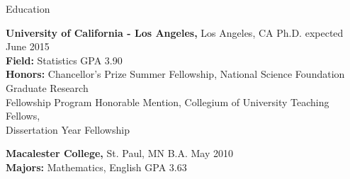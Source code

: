 \documentclass{resume} %
\begin{document}

\begin{rSection}{Education}

{\bf University of California - Los Angeles,} Los Angeles, CA \hfill Ph.D. expected June 2015\\ 
{\bf Field:} Statistics \hfill GPA 3.90 \smallskip \\
{\bf Honors:} Chancellor's Prize Summer Fellowship, National Science Foundation Graduate Research \\Fellowship Program Honorable Mention, Collegium of University Teaching Fellows, \\Dissertation Year Fellowship

{\bf Macalester College,} St. Paul, MN \hfill B.A. May 2010 \\
{\bf Majors:} Mathematics, English \hfill GPA 3.63 
\end{rSection}

\end{document}
